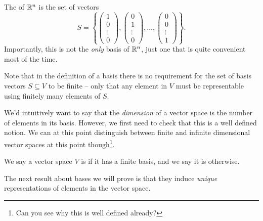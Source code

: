 \documentclass[a4paper]{scrartcl}
\begin{document}
\begin{example}
    The  of $\mathbb{R}^n$ is the set of vectors
    $$
    S = \left\{
        \begin{pmatrix}1 \\ 0 \\ \vdots \\ 0\end{pmatrix},
        \begin{pmatrix}0 \\ 1 \\ \vdots \\ 0\end{pmatrix},
        \dots,
        \begin{pmatrix}0 \\ 0 \\ \vdots \\ 1\end{pmatrix}
    \right\}.
    $$
    Importantly, this is not the \emph{only} basis of $\mathbb{R}^n$, just one that is quite convenient most of the time.
\end{example}

\begin{remark}
    Note that in the definition of a basis there is no requirement for the set of basis vectors $S \subseteq V$ to be finite -- only that any element in $V$ must be representable using finitely many elements of $S$. 
\end{remark}

We'd intuitively want to say that the \emph{dimension} of a vector space is the number of elements in its basis. However, we first need to check that this is a well defined notion.
We can at this point distinguish between finite and infinite dimensional vector spaces at this point though\footnote{Can you see why this is well defined already?}.

\begin{definition}
    We say a vector space $V$ is  if it has a finite basis, and we say it is  otherwise.
\end{definition}

The next result about bases we will prove is that they induce \emph{unique} representations of elements in the vector space.
\end{document}
